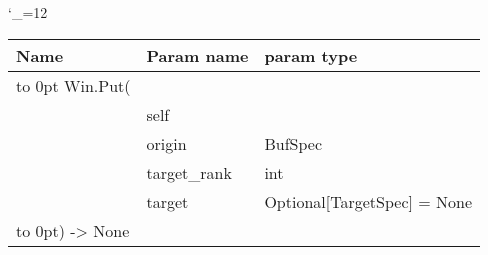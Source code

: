 \begingroup \catcode`\_=12 \tt
\begin{tabular}{lll}
\toprule
\textrm{Name}&\textrm{Param name}&\textrm{param type}\\
\midrule
\hbox to 0pt {Win.Put(\hss}\\
& self\\
& origin & BufSpec\\
& target_rank & int\\
& target & Optional[TargetSpec] = None\\
\hbox to 0pt{) -> None\hss}\\
\bottomrule
\end{tabular}
\endgroup

